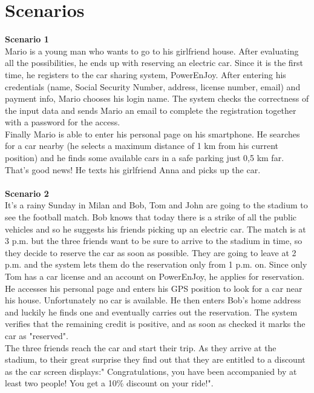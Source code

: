 \documentclass[11pt,a4paper]{report}
\begin{document}
\chapter{Scenarios}
\textbf{Scenario 1}\\
Mario is a young man who wants to go to his girlfriend house. After evaluating all the possibilities, he ends up with reserving an electric car. Since it is the first time, he registers to the car sharing system, PowerEnJoy. After entering his credentials (name, Social Security Number, address, license number, email) and payment info, Mario chooses his login name. The system checks the correctness of the input data and sends Mario an email to complete the registration together with a password for the access.\\
Finally Mario is able to enter his personal page on his smartphone. He searches for a car nearby (he selects a maximum distance of 1 km from his current position) and he finds some available cars in a safe parking just 0,5 km far. That's good news! He texts his girlfriend Anna and picks up the car. \\
\noindent \\
\textbf{Scenario 2}\\
It's a rainy Sunday in Milan and Bob, Tom and John are going to the stadium to see the football match. Bob knows that today there is a strike of all the public vehicles and so he suggests his friends picking up an electric car. The match is at 3 p.m. but the three friends want to be sure to arrive to the stadium in time, so they decide to reserve the car as soon as possible. They are going to leave at 2 p.m. and the system lets them do the reservation only from 1 p.m. on. Since only Tom has a car license and an account on PowerEnJoy, he applies for reservation. He accesses his personal page and enters his GPS position to look for a car near his house. Unfortunately no car is available. He then enters Bob's home address and luckily he finds one and eventually carries out the reservation. The system verifies that the remaining credit is positive, and as soon as checked it marks the car as "reserved".\\ 
The three friends reach the car and start their trip. As they arrive at the stadium, to their great surprise they find out that they are entitled to a discount as the car screen displays:" Congratulations, you have been accompanied by at least two people! You get a 10\% discount on your ride!".\\ 
\noindent \\
\end{document}
